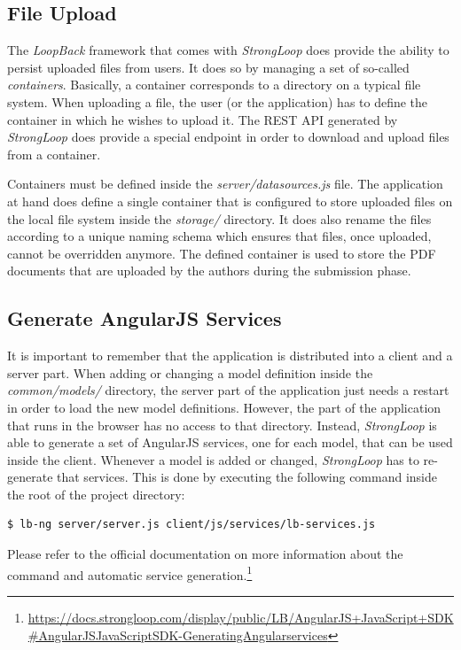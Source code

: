 \documentclass[nochapterpage,nopartpage,noheadingspace,numbersubsubsec,bigchapter,colorback,accentcolor=tud9c,10pt]{tudreport}
\begin{document}
  \subsection{File Upload}
  \label{sec:tech:implementation:strongloop:container}

    The \emph{LoopBack} framework that comes with \emph{StrongLoop} does provide the ability to persist uploaded files from users. It does so by managing a set of so-called \emph{containers}. Basically, a container corresponds to a directory on a typical file system. When uploading a file, the user (or the application) has to define the container in which he wishes to upload it. The REST API generated by \emph{StrongLoop} does provide a special endpoint in order to download and upload files from a container.

    Containers must be defined inside the \emph{server/datasources.js} file. The application at hand does define a single container that is configured to store uploaded files on the local file system inside the \emph{storage/} directory. It does also rename the files according to a unique naming schema which ensures that files, once uploaded, cannot be overridden anymore. The defined container is used to store the PDF documents that are uploaded by the authors during the submission phase.

  \subsection{Generate AngularJS Services}
  \label{sec:tech:implementation:strongloop:genlib}

    It is important to remember that the application is distributed into a client and a server part. When adding or changing a model definition inside the \emph{common/models/} directory, the server part of the application just needs a restart in order to load the new model definitions. However, the part of the application that runs in the browser has no access to that directory. Instead, \emph{StrongLoop} is able to generate a set of AngularJS services, one for each model, that can be used inside the client. Whenever a model is added or changed, \emph{StrongLoop} has to re-generate that services. This is done by executing the following command inside the root of the project directory:
        \begin{lstlisting}[language=bash]
    $ lb-ng server/server.js client/js/services/lb-services.js
        \end{lstlisting}
    Please refer to the official documentation on more information about the command and automatic service generation.\footnote{\url{https://docs.strongloop.com/display/public/LB/AngularJS+JavaScript+SDK\#AngularJSJavaScriptSDK-GeneratingAngularservices}}
\end{document}
